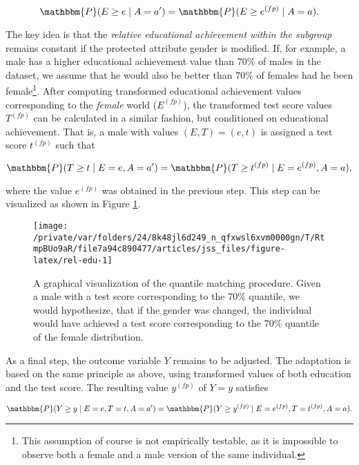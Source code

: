 \documentclass[
  nojss]{jss}
\begin{document}
\[\mathbbm{P}(E \geq e \mid A = a') = \mathbbm{P}(E \geq  {e}^{(fp)} \mid A = a).\]

The key idea is that the \emph{relative educational achievement within
the subgroup} remains constant if the protected attribute gender is
modified. If, for example, a male has a higher educational achievement
value than 70\% of males in the dataset, we assume that he would also be
better than 70\% of females had he been female\footnote{This assumption
  of course is not empirically testable, as it is impossible to observe
  both a female and a male version of the same individual.}. After
computing transformed educational achievement values corresponding to
the \emph{female} world (\( {E}^{(fp)}\)), the transformed test score
values \( {T}^{(fp)}\) can be calculated in a similar fashion, but
conditioned on educational achievement. That is, a male with values
\((E, T) = (e, t)\) is assigned a test score \( {t}^{(fp)}\) such that

\[\mathbbm{P}(T \geq t \mid E = e, A = a') = \mathbbm{P}(T \geq  {t}^{(fp)} \mid E =  {e}^{(fp)}, A = a),\]

where the value \( {e}^{(fp)}\) was obtained in the previous step. This
step can be visualized as shown in Figure \ref{fig:rel-edu}.

\begin{CodeChunk}
\begin{figure}

{\centering \texttt{[image: /private/var/folders/24/8k48jl6d249\_n\_qfxwsl6xvm0000gn/T/RtmpBUo9aR/file7a94c890477/articles/jss\_files/figure-latex/rel-edu-1]} 

}

\caption[A graphical visualization of the quantile matching procedure]{A graphical visualization of the quantile matching procedure. Given a male with a test score corresponding to the 70\% quantile, we would hypothesize, that if the gender was changed, the individual would have achieved a test score corresponding to the 70\% quantile of the female distribution.}\label{fig:rel-edu}
\end{figure}
\end{CodeChunk}

As a final step, the outcome variable \(Y\) remains to be adjusted. The
adaptation is based on the same principle as above, using transformed
values of both education and the test score. The resulting value
\( {y}^{(fp)}\) of \(Y = y\) satisfies

\[\mathbbm{P}(Y \geq y \mid E = e, T = t, A = a') = \mathbbm{P}(Y \geq  {y}^{(fp)} \mid E =  {e}^{(fp)}, T =  {t}^{(fp)}, A = a).\]
\end{document}
